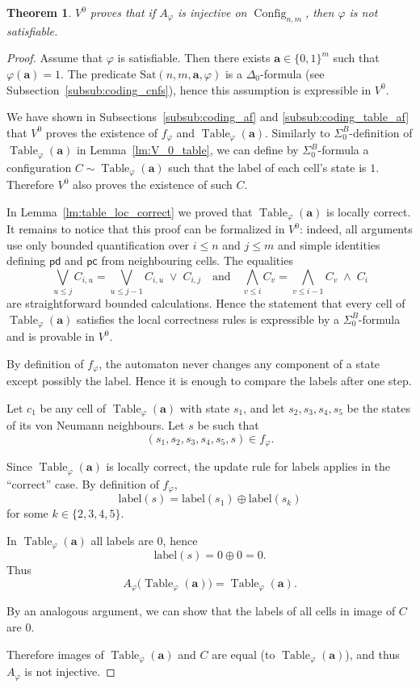 \documentclass{article}
\theoremstyle{plain}
\newtheorem{theorem}{Theorem}[section]
\theoremstyle{definition}
\DeclareMathOperator{\Config}{Config}
\DeclareMathOperator{\Table}{Table}
\newcommand{\pc}{\mathsf{pc}}
\newcommand{\pd}{\mathsf{pd}}
\newcommand{\tuple}{\mathbf}
\begin{document}
\begin{theorem}\label{thm:V0_injective_unsat}
    $V^0$ proves that if $A_\varphi$ is injective on $\Config_{n,m}$, then $\varphi$ is not satisfiable.
\end{theorem}
\begin{proof}

Assume that $\varphi$ is satisfiable.
Then there exists $\tuple a \in \{0,1\}^m$ such that $\varphi(\tuple a)=1$. The predicate $\mathrm{Sat}(n,m,\tuple a,\varphi)$ is a $\Delta_0$-formula
(see Subsection~\ref{subsub:coding_cnfs}),
hence this assumption is expressible in $V^0$.

    We have shown in Subsections~\ref{subsub:coding_af} and \ref{subsub:coding_table_af} that $V^0$ proves the existence of $f_\varphi$ and $\Table_\varphi(\tuple a)$. Similarly to $\Sigma^B_0$-definition of  $\Table_\varphi(\tuple a)$ in Lemma~\ref{lm:V_0_table}, we can define by $\Sigma^B_0$-formula a configuration $C\sim \Table_\varphi(\tuple a)$ such that the label of each cell's state is $1$. Therefore $V^0$ also proves the existence of such $C$.

In Lemma~\ref{lm:table_loc_correct} we proved that $\Table_\varphi(\tuple a)$ is locally correct. It remains to notice that this proof can be formalized in $V^0$: indeed, all arguments use only bounded quantification over $i\le n$ and $j\le m$ and simple identities defining $\pd$ and $\pc$ from neighbouring cells. The equalities
\[
\bigvee_{u\le j} C_{i,u}
=
\bigvee_{u\le j-1} C_{i,u} \;\vee\; C_{i,j}
\quad\text{and}\quad
\bigwedge_{v\le i} C_v
=
\bigwedge_{v\le i-1} C_v \;\wedge\; C_i
\]
are straightforward bounded calculations. Hence the statement that every cell of $\Table_\varphi(\tuple a)$ satisfies the local correctness rules is expressible by a $\Sigma^B_0$-formula and is provable in $V^0$.


    By definition of $f_\varphi$, the automaton never changes
any component of a state except possibly the label.
Hence it is enough to compare the labels after one step.

Let $c_1$ be any cell of $\Table_\varphi(\tuple a)$
with state $s_1$, and let $s_2,s_3,s_4,s_5$
be the states of its von Neumann neighbours.
Let $s$ be such that
\[
(s_1,s_2,s_3,s_4,s_5,s) \in f_\varphi.
\]

Since $\Table_\varphi(\tuple a)$ is locally correct,
the update rule for labels applies in the ``correct'' case.
By definition of $f_\varphi$,
\[
\mathrm{label}(s)
=
\mathrm{label}(s_1)
\oplus
\mathrm{label}(s_k)
\]
for some $k \in \{2,3,4,5\}$.

In $\Table_\varphi(\tuple a)$ all labels are $0$,
hence
\[
\mathrm{label}(s)=0\oplus 0=0.
\]
Thus
\[
A_\varphi\bigl(\Table_\varphi(\tuple a)\bigr)
=
\Table_\varphi(\tuple a).
\]

    By an analogous argument, we can show that the labels of all cells in image of $C$ are $0$.

    Therefore images of $\Table_\varphi(\tuple a)$ and $C$ are equal (to $\Table_\varphi(\tuple a)$), and thus $A_\varphi$ is not injective.
\end{proof}
\end{document}
